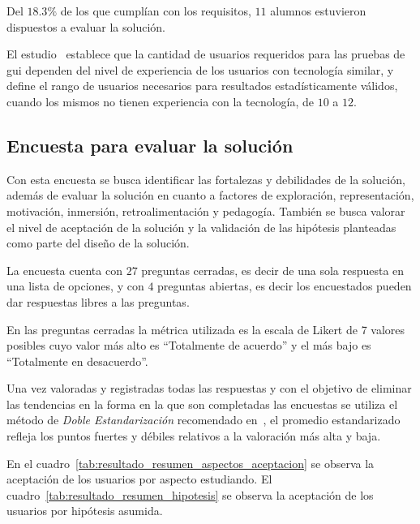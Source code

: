 Del $18.3\%$ de los que cumplían con los requisitos, $11$ alumnos estuvieron
dispuestos a evaluar la solución. 

El estudio~\cite{nielsen2000} establece que la cantidad de usuarios requeridos
para las pruebas de \gls{gui} dependen del nivel de experiencia de los usuarios
con tecnología similar, y~\cite{ritch2009} define el rango de usuarios
necesarios para resultados estadísticamente válidos, cuando los mismos no tienen experiencia con la tecnología, de $10$ a $12$.

\subsection{Encuesta para evaluar la solución}
\label{encuesta_solucion}
Con esta encuesta se busca identificar las fortalezas y debilidades de la 
solución, además de evaluar la solución en cuanto a factores de exploración, 
representación, motivación, inmersión, retroalimentación y pedagogía. También se busca valorar el nivel de aceptación de la solución y la validación de las 
hipótesis planteadas como parte del diseño de la solución.

La encuesta cuenta con $27$ preguntas cerradas, es decir de una sola respuesta 
en una lista de opciones, y con $4$ preguntas abiertas, es decir los encuestados pueden dar respuestas libres a las preguntas. 

En las preguntas cerradas la métrica utilizada es la escala de Likert
\cite{Allen:2007} de 7 valores posibles cuyo valor más alto es
\enquote{Totalmente de acuerdo} y el más bajo es \enquote{Totalmente en 
desacuerdo}. 

Una vez valoradas y registradas todas las respuestas y con el 
objetivo de eliminar las tendencias en la forma en la que son completadas las
encuestas\cite{Fischer2010} se utiliza el método de \emph{Doble 
Estandarización} recomendado en~\cite{Pagolu2011}, el promedio estandarizado 
refleja los puntos fuertes y débiles relativos a la valoración más alta y baja.

En el cuadro~\ref{tab:resultado_resumen_aspectos_aceptacion} se observa 
la aceptación de los usuarios por aspecto estudiando. El 
cuadro~\ref{tab:resultado_resumen_hipotesis} se observa la aceptación
de los usuarios por hipótesis asumida.  

